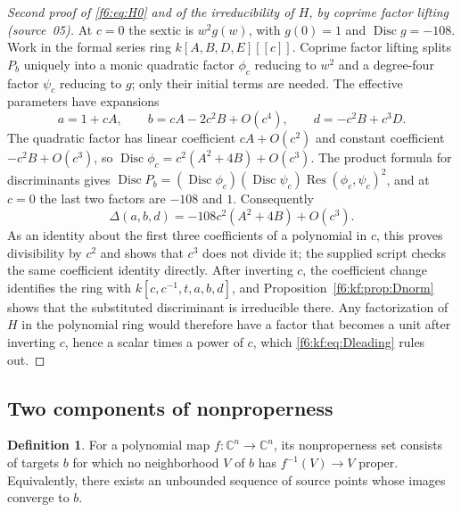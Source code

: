 \documentclass[11pt,a4paper]{article}
\theoremstyle{definition}
\newtheorem{definition}[theorem]{Definition}
\newcommand{\C}{\mathbb C}
\newcommand{\Disc}{\operatorname{Disc}}
\newcommand{\Res}{\operatorname{Res}}
\newcommand{\src}[1]{\textup{(source~#1)}}
\begin{document}
\begin{proof}[Second proof of \eqref{f6:eq:H0} and of the irreducibility of
$H$, by coprime factor lifting \src{05}]
At $c=0$ the sextic is $w^2g(w)$, with $g(0)=1$ and $\Disc g=-108$. Work in
the formal series ring $k[A,B,D,E][[c]]$. Coprime factor lifting splits $P_b$
uniquely into a monic quadratic factor $\phi_c$ reducing to $w^2$ and a
degree-four factor $\psi_c$ reducing to $g$; only their initial terms are
needed. The effective parameters have expansions
\[
a=1+cA,\qquad b=cA-2c^2B+O(c^4),\qquad d=-c^2B+c^3D .
\]
The quadratic factor has linear coefficient $cA+O(c^2)$ and constant
coefficient $-c^2B+O(c^3)$, so $\Disc\phi_c=c^2(A^2+4B)+O(c^3)$. The product
formula for discriminants gives
$\Disc P_b=(\Disc\phi_c)(\Disc\psi_c)\Res(\phi_c,\psi_c)^2$, and at $c=0$ the last two
factors are $-108$ and $1$. Consequently
\begin{equation}\label{f6:kf:eq:Dleading}
\Delta(a,b,d)=-108c^2(A^2+4B)+O(c^3).
\end{equation}
As an identity about the first three coefficients of a polynomial in $c$,
this proves divisibility by $c^2$ and shows that $c^3$ does not divide it;
the supplied script checks the same coefficient identity directly. After
inverting $c$, the coefficient change identifies the ring with
$k[c,c^{-1},t,a,b,d]$, and Proposition~\ref{f6:kf:prop:Dnorm} shows that the
substituted discriminant is irreducible there. Any factorization of $H$ in
the polynomial ring would therefore have a factor that becomes a unit after
inverting $c$, hence a scalar times a power of $c$, which
\eqref{f6:kf:eq:Dleading} rules out.
\end{proof}

\subsection{Two components of nonproperness}
\begin{definition}
For a polynomial map $f:\C^n\to\C^n$, its nonproperness set consists
of targets $b$ for which no neighborhood $V$ of $b$ has
$f^{-1}(V)\to V$ proper. Equivalently, there exists an unbounded sequence
of source points whose images converge to $b$.
\end{definition}
\end{document}
